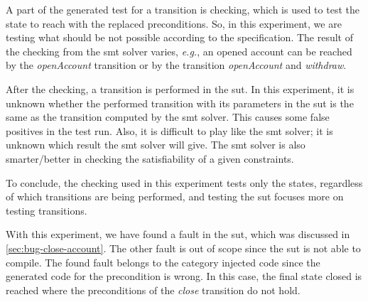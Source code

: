 A part of
the generated test for a transition is checking, which is used to test the state to
reach with the replaced preconditions. So, in this experiment, we are
testing what should be not possible according to the specification. The result
of the checking from the \gls{smt} solver varies, \textit{e.g.}, an opened account can be
reached by the \textit{openAccount} transition or by the transition
\textit{openAccount} and \textit{withdraw}.

After the checking, a transition
is performed in the \gls{sut}. In this experiment, it is unknown whether the
performed transition with its parameters in the \gls{sut} is the same as the
transition computed by the \gls{smt} solver. This causes some false positives in the
test run. Also, it is difficult to play like the \gls{smt} solver; it is unknown which
result the \gls{smt} solver will give. The \gls{smt} solver is also smarter/better in checking
the satisfiability of a given constraints.

To conclude, the checking used in this experiment tests only the states, regardless of which transitions are
being performed, and testing the \gls{sut} focuses more on testing transitions.

With this experiment, we have found a fault in the \gls{sut}, which was
discussed in \autoref{sec:bug-close-account}. The other fault is out of scope
since the \gls{sut} is not able to compile. The found fault belongs to the category
injected code since the generated code for the precondition is wrong. In this
case, the final state closed is reached where the preconditions of the \textit{close}
transition do not hold.





